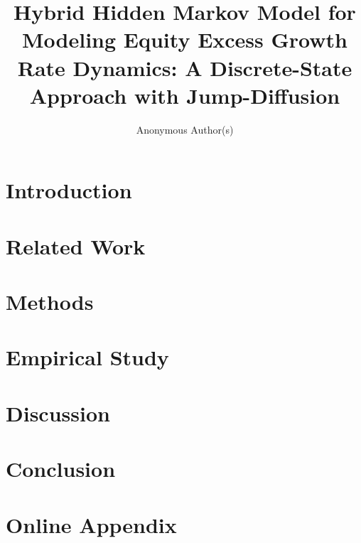 \documentclass[acmsmall,nonacm,screen]{acmart}
\title{Hybrid Hidden Markov Model for Modeling Equity Excess Growth Rate Dynamics: A Discrete-State Approach with Jump-Diffusion}
\author{Anonymous Author(s)}
\affiliation{%
  \institution{Omitted for review}
  \country{Omitted for review}
}
\begin{document}
\maketitle

\section{Introduction}\label{sec:introduction}



\section{Related Work}\label{sec:related-work}


\section{Methods}\label{sec:methods}


\section{Empirical Study}\label{sec:empirical-study}


\section{Discussion}\label{sec:discussion}


\section{Conclusion}\label{sec:conclusion}




\clearpage




\clearpage


\renewcommand\thefigure{S\arabic{figure}}
\renewcommand\thetable{T\arabic{table}}
\renewcommand\thepage{S-\arabic{page}}
\renewcommand\theequation{S\arabic{equation}}

\setcounter{equation}{0}
\setcounter{table}{0}
\setcounter{figure}{0}
\setcounter{page}{1}

\section*{Online Appendix}



\clearpage
\end{document}
